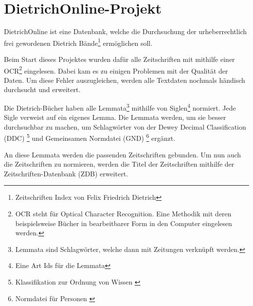 \chapter{DietrichOnline-Projekt}
\label{dietrichonline}

DietrichOnline ist eine Datenbank, welche die Durchsuchung der urheberrechtlich frei gewordenen Dietrich Bände\footnote{Zeitschriften Index von Felix Friedrich Dietrich} ermöglichen soll.

Beim Start dieses Projektes wurden dafür alle Zeitschriften mit mithilfe einer OCR\footnote{OCR steht für Optical Character Recognition. Eine Methodik mit deren beispielsweise Bücher in bearbeitbarer Form in den Computer eingelesen werden.} eingelesen. Dabei kam es zu einigen Problemen mit der Qualität der Daten. Um diese Fehler auszugleichen, werden alle Textdaten nochmals händisch durchsucht und erweitert.

Die Dietrich-Bücher haben alle Lemmata\footnote{Lemmata sind Schlagwörter, welche dann mit Zeitungen verknüpft werden.} mithilfe von Siglen\footnote{Eine Art Ids für die Lemmata} normiert. Jede Sigle verweist auf ein eigenes Lemma. Die Lemmata werden, um sie besser durchsuchbar zu machen, um Schlagwörter von der Dewey Decimal Classification (DDC)  \footnote{Klassifikation zur Ordnung von Wissen \cite{DeutscheNationalBibliothek.ddc}} und Gemeinsamen Normdatei (GND)  \footnote{Normdatei für Personen \cite{DeutscheNationalBibliothek.2019b}} ergänzt.

An diese Lemmata werden die passenden Zeitschriften gebunden. Um nun auch die Zeitschriften zu normieren, werden die Titel der Zeitschriften mithilfe der Zeitschriften-Datenbank (ZDB) erweitert. \cite{UniversityofTrier.2016}